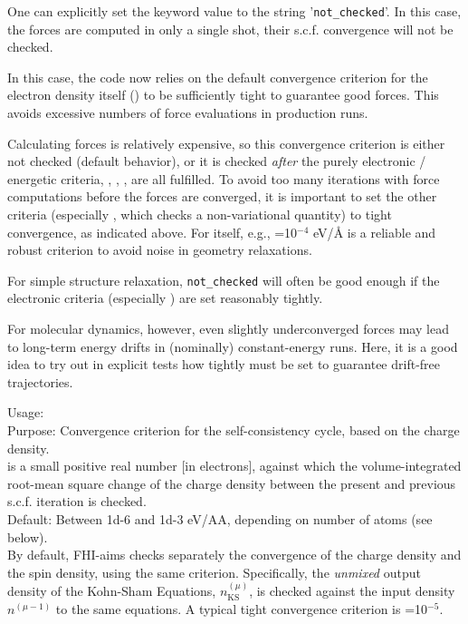 One can explicitly set the keyword value to the string
'\texttt{not\_checked}'. In this case, the forces are computed in only
a single shot, their s.c.f. convergence will not be checked.

In this case, the code now relies on the default convergence criterion for
the electron density itself () to be sufficiently
tight to guarantee good forces. This avoids excessive numbers of force
evaluations in production runs.

Calculating forces is relatively expensive, so this convergence
criterion is either not checked (default behavior), or it
is checked \emph{after} the purely electronic /
energetic criteria, ,
, , are all
fulfilled. To avoid too many iterations with force computations before
the forces are converged, it is important to set the other criteria
(especially , which checks a
non-variational quantity) to tight convergence, as indicated
above. For  itself, e.g.,
=10$^{-4}$ eV/{\AA} is a reliable and robust criterion
to avoid noise in geometry relaxations.

For simple structure relaxation, \texttt{not\_checked} will often be
good enough if the electronic criteria (especially
) are set reasonably tightly.

For molecular
dynamics, however, even slightly underconverged forces may lead to
long-term energy drifts in (nominally) constant-energy runs. Here, it
is a good idea to try out in explicit tests how tightly
 must be set to guarantee drift-free
trajectories.

{
  \noindent
  Usage:   \\[1.0ex]
  Purpose: Convergence criterion for the self-consistency cycle, based
    on the charge density. \\[1.0ex]
   is a small positive real number [in electrons],
  against which the volume-integrated root-mean square change of the
  charge density between the present and previous s.c.f. iteration is
  checked. \\[1.0ex]
  Default: Between 1d-6 and 1d-3 eV/AA, depending on number of atoms (see below). \\
}
By default, FHI-aims checks separately the convergence of the charge
density and the spin density, using the same criterion. Specifically,
the \emph{unmixed} output density of the Kohn-Sham Equations,
$n_\text{KS}^{(\mu)}$, is checked against the input density
$n^{(\mu-1)}$ to the same equations. A typical tight convergence
criterion is =10$^{-5}$.

